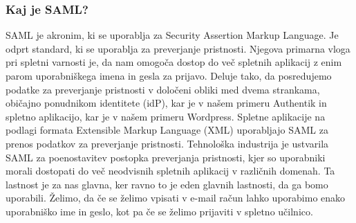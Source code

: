 \documentclass[a4paper,12pt,openright]{book}
\begin{document}
{\subsubsection{Kaj je SAML?}
SAML je akronim, ki se uporablja za Security Assertion Markup Language. Je odprt standard, ki se uporablja za preverjanje pristnosti. Njegova primarna vloga pri spletni varnosti je, da nam omogoča dostop do več spletnih aplikacij z enim parom uporabniškega imena in gesla za prijavo. Deluje tako, da posredujemo podatke za preverjanje pristnosti v določeni obliki med dvema strankama, običajno ponudnikom identitete (idP), kar je v našem primeru Authentik in spletno aplikacijo, kar je v našem primeru Wordpress.
Spletne aplikacije na podlagi formata Extensible Markup Language (XML) uporabljajo SAML za prenos podatkov za preverjanje pristnosti.
\newline
Tehnološka industrija je ustvarila SAML za poenostavitev postopka preverjanja pristnosti, kjer so uporabniki morali dostopati do več neodvisnih spletnih aplikacij v različnih domenah. Ta lastnost je za nas glavna, ker ravno to je eden glavnih lastnosti, da ga bomo uporabili. Želimo, da če se želimo vpisati v e-mail račun lahko uporabimo enako uporabniško ime in geslo, kot pa če se želimo prijaviti v spletno učilnico. 

}
\end{document}
